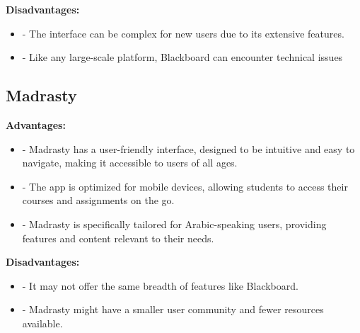 \documentclass[12pt]{article}
\begin{document}
\newpage
\textbf{Disadvantages:}
\begin{itemize}
\item -	The interface can be complex for new users due to its extensive features.
\item -	Like any large-scale platform, Blackboard can encounter technical issues

\end{itemize}

\subsection{Madrasty}

\textbf{Advantages:}
\begin{itemize}
\item
 -	Madrasty has a user-friendly interface, designed to be intuitive and easy to navigate, making it accessible to users of all ages.
\item
-	The app is optimized for mobile devices, allowing students to access their courses and assignments on the go.
\item
-	Madrasty is specifically tailored for Arabic-speaking users, providing features and content relevant to their needs.

\end{itemize}

\textbf{Disadvantages:}
\begin{itemize}
\item 
-	It may not offer the same breadth of features like Blackboard.
\item 
-	Madrasty might have a smaller user community and fewer resources available.

\end{itemize}
\end{document}
